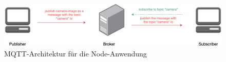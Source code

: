 \begin{figure}[h]
  \centering
  \includegraphics[width=145mm]{images/mqtt.png}
  \caption{MQTT-Architektur für die Node-Anwendung \cite{mqtt}}
  \label{fig:arch-mqtt}
\end{figure}

